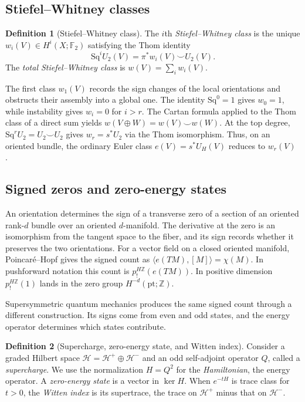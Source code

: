 \documentclass[11pt]{article}
\theoremstyle{definition}
\newtheorem{defn}{Definition}[section]
\newcommand{\F}{\mathbb F}
\newcommand{\Z}{\mathbb Z}
\begin{document}
\subsection{Stiefel--Whitney classes}
\begin{defn}[Stiefel--Whitney class]
The \(i\)th \emph{Stiefel--Whitney class} is the unique \(w_i(V)\in H^i(X;\F_2)\) satisfying the Thom identity
\[
 \mathrm{Sq}^i U_2(V)=\pi^*w_i(V)\smile U_2(V).
\]
The \emph{total Stiefel--Whitney class} is \(w(V)=\sum_i w_i(V)\).
\end{defn}
The first class \(w_1(V)\) records the sign changes of the local orientations and obstructs their assembly into a global one. The identity \(\mathrm{Sq}^0=1\) gives \(w_0=1\), while instability gives \(w_i=0\) for \(i>r\). The Cartan formula applied to the Thom class of a direct sum yields \(w(V\oplus W)=w(V)\smile w(W)\). At the top degree, \(\mathrm{Sq}^rU_2=U_2\smile U_2\) gives \(w_r=s^*U_2\) via the Thom isomorphism. Thus, on an oriented bundle, the ordinary Euler class \(e(V)=s^*U_H(V)\) reduces to \(w_r(V)\) \cite{MS}.

\subsection{Signed zeros and zero-energy states}\label{zeros}
An orientation determines the sign of a transverse zero of a section of an oriented rank-\(d\) bundle over an oriented \(d\)-manifold. The derivative at the zero is an isomorphism from the tangent space to the fiber, and its sign records whether it preserves the two orientations. For a vector field on a closed oriented manifold, Poincar\'e--Hopf gives the signed count as \(\langle e(TM),[M]\rangle=\chi(M)\). In pushforward notation this count is \(p_!^{H\Z}(e(TM))\). In positive dimension \(p_!^{H\Z}(1)\) lands in the zero group \(H^{-d}(\mathrm{pt};\Z)\).

Supersymmetric quantum mechanics produces the same signed count through a different construction. Its signs come from even and odd states, and the energy operator determines which states contribute.

\begin{defn}[Supercharge, zero-energy state, and Witten index]
Consider a graded Hilbert space \(\mathcal H=\mathcal H^+\oplus\mathcal H^-\) and an odd self-adjoint operator \(Q\), called a \emph{supercharge}. We use the normalization \(H=Q^2\) for the \emph{Hamiltonian}, the energy operator. A \emph{zero-energy state} is a vector in \(\ker H\). When \(e^{-tH}\) is trace class for \(t>0\), the \emph{Witten index} is its supertrace, the trace on \(\mathcal H^+\) minus that on \(\mathcal H^-\).
\end{defn}
\end{document}
